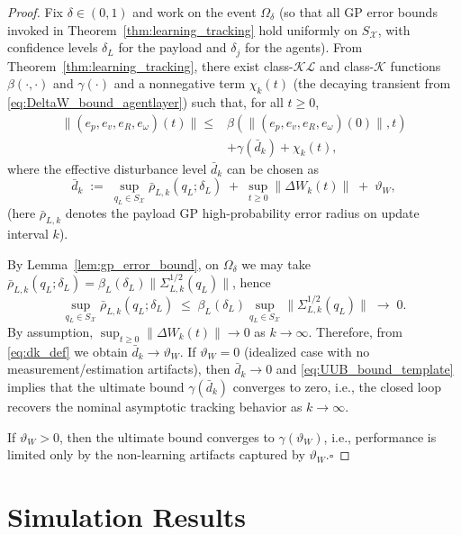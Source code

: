 \documentclass[letterpaper, 10 pt, conference]{ieeeconf}  %
\newcommand{\0}{\matr{0}}
\begin{document}
\begin{proof}
Fix $\delta\in(0,1)$ and work on the event $\Omega_\delta$ (so that all GP error bounds invoked in
Theorem~\ref{thm:learning_tracking} hold uniformly on $S_{\mathcal X}$, with confidence levels
$\delta_L$ for the payload and $\delta_j$ for the agents).
From Theorem~\ref{thm:learning_tracking}, there exist class-$\mathcal{K}\mathcal{L}$ and class-$\mathcal{K}$ functions
$\beta(\cdot,\cdot)$ and $\gamma(\cdot)$ and a nonnegative term $\chi_k(t)$ (the decaying transient from
\eqref{eq:DeltaW_bound_agentlayer}) such that, for all $t\ge 0$,
\begin{align}
\|(e_p,e_v,e_R,e_\omega)(t)\|
\le&
\beta\!\left(\|(e_p,e_v,e_R,e_\omega)(0)\|,t\right)\nonumber\\
&+\gamma\!\left(\bar d_k\right)
+\chi_k(t),
\label{eq:UUB_bound_template}
\end{align}
where the effective disturbance level $\bar d_k$ can be chosen as
\begin{equation}
\bar d_k
\;:=\;
\sup_{q_L\in S_{\mathcal X}}\bar\rho_{L,k}(q_L;\delta_L)
\;+\;
\sup_{t\ge 0}\|\Delta W_k(t)\|
\;+\;\vartheta_W,
\label{eq:dk_def}
\end{equation}
(here $\bar\rho_{L,k}$ denotes the payload GP high-probability error radius on update interval $k$).

By Lemma~\ref{lem:gp_error_bound}, on $\Omega_\delta$ we may take
$\bar\rho_{L,k}(q_L;\delta_L)=\beta_L(\delta_L)\|\Sigma_{L,k}^{1/2}(q_L)\|$, hence
\[
\sup_{q_L\in S_{\mathcal X}}\bar\rho_{L,k}(q_L;\delta_L)
\;\le\;
\beta_L(\delta_L)\sup_{q_L\in S_{\mathcal X}}\|\Sigma_{L,k}^{1/2}(q_L)\|
\;\longrightarrow\;0.
\]
By assumption, $\sup_{t\ge 0}\|\Delta W_k(t)\|\to 0$ as $k\to\infty$.
Therefore, from \eqref{eq:dk_def} we obtain $\bar d_k\to \vartheta_W$.
If $\vartheta_W=0$ (idealized case with no measurement/estimation artifacts), then $\bar d_k\to 0$ and
\eqref{eq:UUB_bound_template} implies that the ultimate bound $\gamma(\bar d_k)$ converges to zero, i.e., the closed loop
recovers the nominal asymptotic tracking behavior as $k\to\infty$.

If $\vartheta_W>0$, then the ultimate bound converges to $\gamma(\vartheta_W)$, i.e., performance is limited only by the
non-learning artifacts captured by $\vartheta_W$.\hfill$\square$
\end{proof}
\section{Simulation Results}
\label{sec:simulations}
\end{document}
